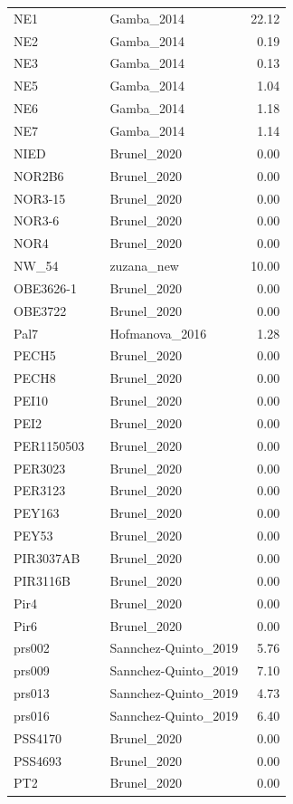 \begin{longtable}[t]{lllr}
NE1 &  & Gamba\_2014 & 22.12\\
NE2 &  & Gamba\_2014 & 0.19\\
NE3 &  & Gamba\_2014 & 0.13\\
NE5 &  & Gamba\_2014 & 1.04\\
NE6 &  & Gamba\_2014 & 1.18\\
NE7 &  & Gamba\_2014 & 1.14\\
NIED &  & Brunel\_2020 & 0.00\\
NOR2B6 &  & Brunel\_2020 & 0.00\\
NOR3-15 &  & Brunel\_2020 & 0.00\\
NOR3-6 &  & Brunel\_2020 & 0.00\\
NOR4 &  & Brunel\_2020 & 0.00\\
NW\_54 &  & zuzana\_new & 10.00\\
OBE3626-1 &  & Brunel\_2020 & 0.00\\
OBE3722 &  & Brunel\_2020 & 0.00\\
Pal7 &  & Hofmanova\_2016 & 1.28\\
PECH5 &  & Brunel\_2020 & 0.00\\
PECH8 &  & Brunel\_2020 & 0.00\\
PEI10 &  & Brunel\_2020 & 0.00\\
PEI2 &  & Brunel\_2020 & 0.00\\
PER1150503 &  & Brunel\_2020 & 0.00\\
PER3023 &  & Brunel\_2020 & 0.00\\
PER3123 &  & Brunel\_2020 & 0.00\\
PEY163 &  & Brunel\_2020 & 0.00\\
PEY53 &  & Brunel\_2020 & 0.00\\
PIR3037AB &  & Brunel\_2020 & 0.00\\
PIR3116B &  & Brunel\_2020 & 0.00\\
Pir4 &  & Brunel\_2020 & 0.00\\
Pir6 &  & Brunel\_2020 & 0.00\\
prs002 &  & Sannchez-Quinto\_2019 & 5.76\\
prs009 &  & Sannchez-Quinto\_2019 & 7.10\\
prs013 &  & Sannchez-Quinto\_2019 & 4.73\\
prs016 &  & Sannchez-Quinto\_2019 & 6.40\\
PSS4170 &  & Brunel\_2020 & 0.00\\
PSS4693 &  & Brunel\_2020 & 0.00\\
PT2 &  & Brunel\_2020 & 0.00\\

\end{longtable}
